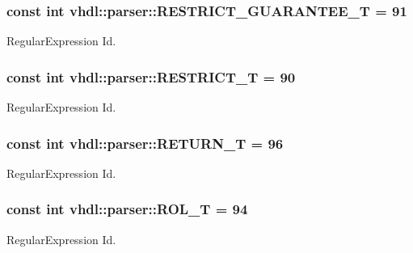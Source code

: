 \subsubsection[{R\+E\+S\+T\+R\+I\+C\+T\+\_\+\+G\+U\+A\+R\+A\+N\+T\+E\+E\+\_\+\+T}]{\setlength{\rightskip}{0pt plus 5cm}const int vhdl\+::parser\+::\+R\+E\+S\+T\+R\+I\+C\+T\+\_\+\+G\+U\+A\+R\+A\+N\+T\+E\+E\+\_\+\+T = 91}\label{namespacevhdl_1_1parser_a73f7fb766dda4d4f0e76a388c96aabfe}
Regular\+Expression Id. \hypertarget{namespacevhdl_1_1parser_ad7fbbc15b1c4532e542dc93b858aa819}{}
\subsubsection[{R\+E\+S\+T\+R\+I\+C\+T\+\_\+\+T}]{\setlength{\rightskip}{0pt plus 5cm}const int vhdl\+::parser\+::\+R\+E\+S\+T\+R\+I\+C\+T\+\_\+\+T = 90}\label{namespacevhdl_1_1parser_ad7fbbc15b1c4532e542dc93b858aa819}
Regular\+Expression Id. \hypertarget{namespacevhdl_1_1parser_a8120dc025fb6dbadc47354d5801c66f4}{}
\subsubsection[{R\+E\+T\+U\+R\+N\+\_\+\+T}]{\setlength{\rightskip}{0pt plus 5cm}const int vhdl\+::parser\+::\+R\+E\+T\+U\+R\+N\+\_\+\+T = 96}\label{namespacevhdl_1_1parser_a8120dc025fb6dbadc47354d5801c66f4}
Regular\+Expression Id. \hypertarget{namespacevhdl_1_1parser_a391ae80424c89115ae16df3bc2afea1d}{}
\subsubsection[{R\+O\+L\+\_\+\+T}]{\setlength{\rightskip}{0pt plus 5cm}const int vhdl\+::parser\+::\+R\+O\+L\+\_\+\+T = 94}\label{namespacevhdl_1_1parser_a391ae80424c89115ae16df3bc2afea1d}
Regular\+Expression Id. \hypertarget{namespacevhdl_1_1parser_a705cf7ce2e59683c656b8076a935d8e3}{}
